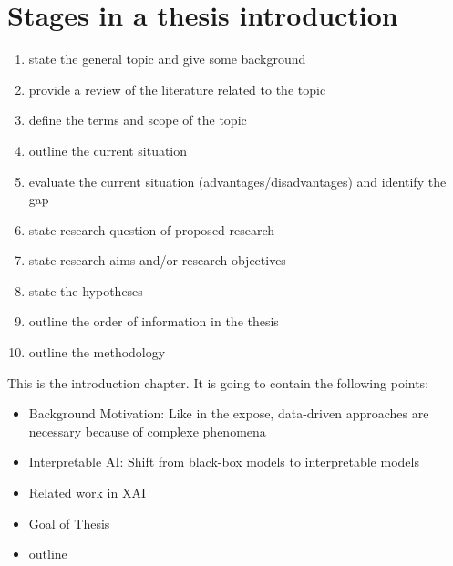 \documentclass[10pt,a4paper]{article}
\begin{document}
\section{Stages in a thesis introduction}

\begin{enumerate}
	\color{OliveGreen}
	\item state the general topic and give some background
	\item provide a review of the literature related to the topic
	\item define the terms and scope of the topic
	\color{Red}
	\item outline the current situation
	\item evaluate the current situation (advantages/disadvantages) and identify the gap
	\color{Mahogany}
	\item state research question of proposed research
	\item state research aims and/or research objectives
	\item state the hypotheses
	\item outline the order of information in the thesis
	\item outline the methodology
	
\end{enumerate}

This is the introduction chapter. It is going to contain the following points:

\begin{itemize}
	\item Background Motivation: Like in the expose, data-driven approaches are necessary because of complexe phenomena
	\item Interpretable AI: Shift from black-box models to interpretable models
	\item Related work in XAI
	\item Goal of Thesis
	\item outline
\end{itemize}
	
\printbibliography
	
\end{document}
